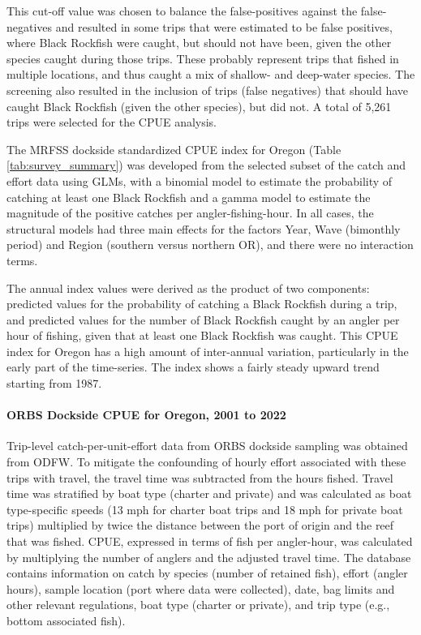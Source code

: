 \documentclass[11pt,
  letterpaper,
]{article}
\begin{document}
This cut-off value was chosen to balance the false-positives against the false-negatives and resulted in some trips that were estimated to be false positives, where Black Rockfish were caught, but should not have been, given the other species caught during those trips. These probably represent trips that fished in multiple locations, and thus caught a mix of shallow- and deep-water species. The screening also resulted in the inclusion of trips (false negatives) that should have caught Black Rockfish (given the other species), but did not. A total of 5,261 trips were selected for the CPUE analysis.

The MRFSS dockside standardized CPUE index for Oregon (Table \ref{tab:survey_summary}) was developed from the selected subset of the catch and effort data using GLMs, with a binomial model to estimate the probability of catching at least one Black Rockfish and a gamma model to estimate the magnitude of the positive catches per angler-fishing-hour. In all cases, the structural models had three main effects for the factors Year, Wave (bimonthly period) and Region (southern versus northern OR), and there were no interaction terms.

The annual index values were derived as the product of two components: predicted values for the probability of catching a Black Rockfish during a trip, and predicted values for the number of Black Rockfish caught by an angler per hour of fishing, given that at least one Black Rockfish was caught. This CPUE index for Oregon has a high amount of inter-annual variation, particularly in the early part of the time-series. The index shows a fairly steady upward trend starting from 1987.

\hypertarget{orbs-dockside-cpue-for-oregon-2001-to-2022}{%
\paragraph{ORBS Dockside CPUE for Oregon, 2001 to 2022}\label{orbs-dockside-cpue-for-oregon-2001-to-2022}}

Trip-level catch-per-unit-effort data from ORBS dockside sampling was obtained from ODFW. To mitigate the confounding of hourly effort associated with these trips with travel, the travel time was subtracted from the hours fished. Travel time was stratified by boat type (charter and private) and was calculated as boat type-specific speeds (13 mph for charter boat trips and 18 mph for private boat trips) multiplied by twice the distance between the port of origin and the reef that was fished. CPUE, expressed in terms of fish per angler-hour, was calculated by multiplying the number of anglers and the adjusted travel time. The database contains information on catch by species (number of retained fish), effort (angler hours), sample location (port where data were collected), date, bag limits and other relevant regulations, boat type (charter or private), and trip type (e.g., bottom associated fish).
\end{document}
